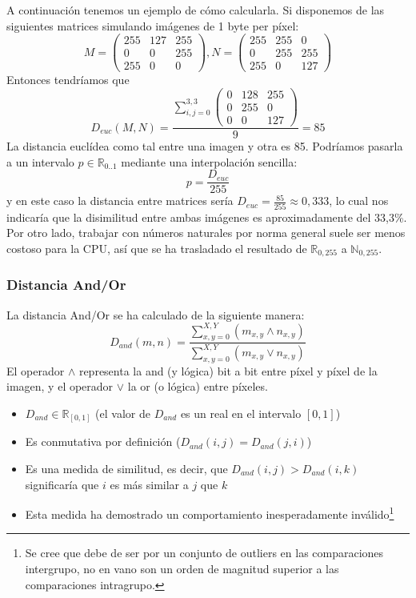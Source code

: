 A continuación tenemos un ejemplo de cómo calcularla. Si disponemos de las siguientes matrices simulando imágenes de 1 byte per píxel:
\[ M=\left( \begin{array}{lcr}
	255 & 127 & 255 \\
	0 & 0 & 255 \\
	255 & 0 & 0 
\end{array} \right), N=\left( \begin{array}{lcr}
	255 & 255 & 0 \\
	0 & 255 & 255 \\
	255 & 0 & 127 
\end{array} \right) 
\]
Entonces tendríamos que 
\[D_{euc}(M,N) = \frac
	{\sum_{i,j=0}^{3,3}\left( 
		\begin{array}{lcr}
			0 & 128 & 255\\ 0 & 255 & 0 \\ 0 & 0 & 127 
		\end{array} 
	\right)}
	{9} = 85
\]
La distancia euclídea como tal entre una imagen y otra es 85. Podríamos pasarla a un intervalo $p \in \mathbb{R}_{0..1}$ mediante una interpolación sencilla:
\[
	p = \frac{D_{euc}}{255}
\]
y en este caso la distancia entre matrices sería $D_{euc}=\frac{85}{255}\approx0,333$, lo cual nos indicaría que la disimilitud entre ambas imágenes es aproximadamente del 33,3\%. Por otro lado, trabajar con números naturales por norma general suele ser menos costoso para la CPU, así que se ha trasladado el resultado de $\mathbb{R}_{0,255}$ a $\mathbb{N}_{0,255}$.

\subsubsection{Distancia And/Or}
La distancia And/Or se ha calculado de la siguiente manera:
\[
D_{and}(m,n)=\frac{ \sum_{x,y=0}^{X,Y}(m_{x,y} \wedge n_{x,y}) }{ \sum_{x,y=0}^{X,Y}(m_{x,y} \vee n_{x,y}) }
\]
El operador $\wedge$ representa la and (y lógica) bit a bit entre píxel y píxel de la imagen, y el operador $\vee$ la or (o lógica) entre píxeles. 
\begin{itemize}
	\item{$D_{and}\in\mathbb{R}_{\left[0,1\right]}$ (el valor de $D_{and}$ es un real en el intervalo $\left[0,1\right]$)} 
	\item{Es conmutativa por definición ($D_{and}(i,j)=D_{and}(j,i)$)}
	\item{Es una medida de similitud, es decir, que $D_{and}(i,j) > D_{and} (i,k)$ significaría que $i$ es más similar a $j$ que $k$}
	\item{Esta medida ha demostrado un comportamiento inesperadamente inválido\footnote{Se cree que debe de ser por un conjunto de outliers en las comparaciones intergrupo, no en vano son un orden de magnitud superior a las comparaciones intragrupo.}}
\end{itemize}

